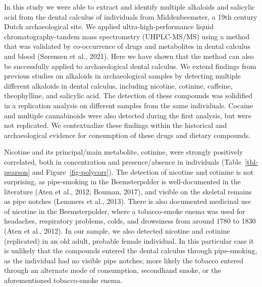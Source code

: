\documentclass[
]{article}
\begin{document}
In this study we were able to extract and identify multiple alkaloids
and salicylic acid from the dental calculus of individuals from
Middenbeemster, a 19th century Dutch archaeological site. We applied
ultra-high-performance liquid chromatography-tandem mass spectrometry
(UHPLC-MS/MS) using a method that was validated by co-occurrence of
drugs and metabolites in dental calculus and blood (Sørensen et al.,
2021). Here we have shown that the method can also be successfully
applied to archaeological dental calculus. We extend findings from
previous studies on alkaloids in archaeological samples by detecting
multiple different alkaloids in dental calculus, including nicotine,
cotinine, caffeine, theophylline, and salicylic acid. The detection of
these compounds was solidified in a replication analysis on different
samples from the same individuals. Cocaine and multiple cannabinoids
were also detected during the first analysis, but were not replicated.
We contextualize these findings within the historical and archaeological
evidence for consumption of these drugs and dietary compounds.

Nicotine and its principal/main metabolite, cotinine, were strongly
positively correlated, both in concentration and presence/absence in
individuals (Table~\ref{tbl-pearson} and Figure~\ref{fig-polycorr}). The
detection of nicotine and cotinine is not surprising, as pipe-smoking in
the Beemsterpolder is well-documented in the literature (Aten et al.,
2012; Bouman, 2017), and visible on the skeletal remains as pipe notches
(Lemmers et al., 2013). There is also documented medicinal use of
nicotine in the Beemsterpolder, where a tobacco-smoke enema was used for
headaches, respiratory problems, colds, and drowsiness from around 1780
to 1830 (Aten et al., 2012). In our sample, we also detected nicotine
and cotinine (replicated) in an old adult, probable female individual.
In this particular case it is unlikely that the compounds entered the
dental calculus through pipe-smoking, as the individual had no visible
pipe notches; more likely the tobacco entered through an alternate mode
of consumption, secondhand smoke, or the aforementioned tobacco-smoke
enema.
\end{document}
